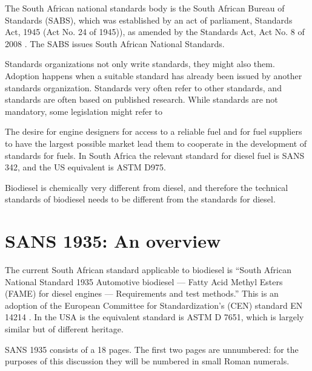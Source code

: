 The South African national standards body is the South African Bureau of
Standards (SABS), which was established by an act of parliament,
 Standards Act, 1945 (Act No. 24 of 1945)), as amended by the Standards Act, Act
 No. 8 of 2008 \autocite{Act8-2008}. The SABS issues South African National
 Standards.

Standards organizations not only write standards, they might also
 them. Adoption happens when a suitable standard has already been
issued by another standards organization. Standards very often refer to other
standards, and standards are often based on published research. While standards
are not mandatory, some legislation might refer to 

The desire for engine designers for access to a reliable fuel and for fuel
suppliers to have the largest possible market lead them to cooperate in the
development of standards for fuels. In South Africa the relevant standard for
diesel fuel is SANS 342, and the US equivalent is ASTM D975.

Biodiesel is chemically very different from diesel, and therefore the technical
standards of biodiesel needs to be different from the standards for diesel.


\section{SANS 1935: An overview}

The current South African standard applicable to biodiesel is ``South African
National Standard 1935 Automotive biodiesel — Fatty Acid Methyl Esters (FAME)
for diesel engines — Requirements and test methods.'' \autocite{SANS1935} This
is an adoption of the European Committee for Standardization's (CEN) standard EN
14214 \autocite{EN14214}. In the USA is the equivalent standard is ASTM D 7651,
which is largely similar but of different heritage.

SANS 1935 consists of a 18 pages. The first two pages are unnumbered: for the
purposes of this discussion they will be numbered in small Roman numerals.

